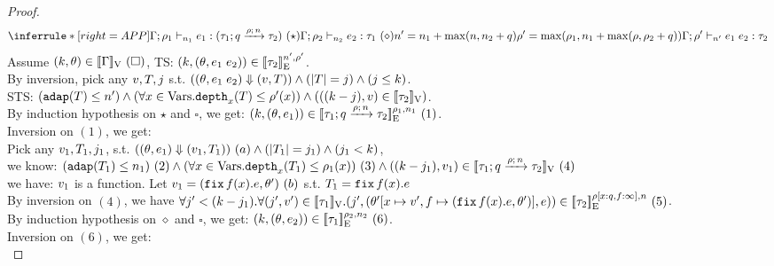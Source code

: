 \documentclass[a4paper,11pt]{article}
\theoremstyle{definition}
\begin{document}
\begin{proof}
\[
    \inferrule*[right = APP]
    {
      \Gamma; \dmap_1 \tvdash{\nnatA_1} \expr_1: (\tarr{\type_1}{\type_2}{\nnatbiA}{\dmap}{\nnatA})~(\star) \\
      \Gamma; \dmap_2 \tvdash{\nnatA_2} \expr_2: \type_1 ~(\diamond)\\\\
      \nnatA' = \nnatA_1 + \max(\nnatA, \nnatA_2 + \nnatbiA) \\
      \dmap' = \max(\dmap_1, \nnatA_1 + \max(\dmap, \dmap_2 + \nnatbiA))
    }{
      \Gamma; \dmap' \tvdash{\nnatA'} \expr_1 \eapp \expr_2 : \type_2
    }
\]
%
Assume $(\stepiA, \env) \in \lrv{\Gamma} ~ (\square)$, TS: $(\stepiA, (\env, \expr_1 \eapp \expr_2)) \in \lre{\nnatA'}{\dmap'}{\type_2}$.\\
%
By inversion, pick any $\valr, \tr, j$ s.t. $((\env, \expr_1 \eapp \expr_2) \bigstep (\valr, \tr)) \land (\size{\tr} = j) \land (j \leq \stepiA) $.\\
%
STS: $(\adap(\tr) \leq \nnatA') \land (\forall x \in \mbox{Vars}. \ddep{x}(\tr) \leq \dmap'(x)) \land (((\stepiA - j), \valr) \in \lrv{\type_2})$.\\
%
By induction hypothesis on $\star$ and $\square$, we get: $(\stepiA, (\env, \expr_1)) \in \lre{\dmap_1}{\nnatA_1}{\tarr{\type_1}{\type_2}{\nnatbiA}{\dmap}{\nnatA}} ~(1) $.\\
%
Inversion on $(1)$, we get:\\
%
Pick any $\valr_1, \tr_1, j_1$, s.t. $((\env, \expr_1) \bigstep (\valr_1, \tr_1)) ~(a) \land (\size{\tr_1} = j_1) \land (j_1 < \stepiA)$, \\
%
we know: $(\adap(\tr_1) \leq \nnatA_1)~(2) \land (\forall x \in \mbox{Vars}. \ddep{x}(\tr_1) \leq \dmap_1(x))~(3) \land ((\stepiA - j_1), \valr_1) \in \lrv{\tarr{\type_1}{\type_2}{\nnatbiA}{\dmap}{\nnatA}} ~ (4)$\\
%
we have: $\valr_1$ is a function.
%
Let $\valr_1 = (\efix f(x). \expr, \env') ~(b)$ s.t. $\tr_1= \efix f(x). \expr$\\
By inversion on $(4)$, we have $\forall j' < (\stepiA - j_1). \forall (j', \valr') \in \lrv{\type_1}. (j', (\env'[x \mapsto \valr', f \mapsto (\efix f(x).\expr, \env')], \expr)) \in \lre{\dmap[x : \nnatbiA, f: \infty]}{\nnatA}{\type_2} ~ (5)$.\\ 
%
By induction hypothesis on $\diamond$ and $\square$, we get:
%
$(\stepiA, (\env, \expr_2)) \in \lre{\dmap_2}{\nnatA_2}{\type_1} ~(6)$.\\
%
Inversion on $(6)$, we get:\\

\end{proof}
\end{document}
